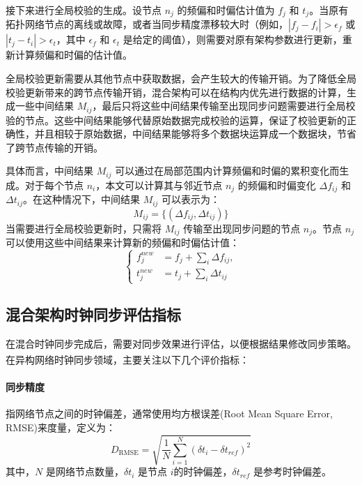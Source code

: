 \documentclass[UTF8,a4paper,12pt]{ctexart}
\numberwithin{equation}{section}
\begin{document}
接下来进行全局校验的生成。设节点 $n_j$ 的频偏和时偏估计值为 $f_j$ 和 $t_j$。当原有拓扑网络节点的离线或故障，或者当同步精度漂移较大时（例如，$|f_j - f_i| > \epsilon_f$ 或 $|t_j - t_i| > \epsilon_t$，其中 $\epsilon_f$ 和 $\epsilon_t$ 是给定的阈值），则需要对原有架构参数进行更新，重新计算频偏和时偏的估计值。

全局校验更新需要从其他节点中获取数据，会产生较大的传输开销。为了降低全局校验更新带来的跨节点传输开销，混合架构可以在结构内优先进行数据的计算，生成一些中间结果 $M_{ij}$，最后只将这些中间结果传输至出现同步问题需要进行全局校验的节点。这些中间结果能够代替原始数据完成校验的运算，保证了校验更新的正确性，并且相较于原始数据，中间结果能够将多个数据块运算成一个数据块，节省了跨节点传输的开销。

具体而言，中间结果 $M_{ij}$ 可以通过在局部范围内计算频偏和时偏的累积变化而生成。对于每个节点 $n_i$，本文可以计算其与邻近节点 $n_j$ 的频偏和时偏变化 $\Delta f_{ij}$ 和 $\Delta t_{ij}$。在这种情况下，中间结果 $M_{ij}$ 可以表示为：
\begin{equation}
	M_{ij} = \{(\Delta f_{ij}, \Delta t_{ij})\}
\end{equation}
当需要进行全局校验更新时，只需将 $M_{ij}$ 传输至出现同步问题的节点 $n_j$。节点 $n_j$ 可以使用这些中间结果来计算新的频偏和时偏估计值：
\begin{equation}
	\left\{
	\begin{aligned}
	f_j^{new} &= f_j + \sum_{i} \Delta f_{ij},\\
	t_j^{new} &= t_j + \sum_{i} \Delta t_{ij}
	\end{aligned}
	\right.
\end{equation}


\subsection{混合架构时钟同步评估指标}

在混合时钟同步完成后，需要对同步效果进行评估，以便根据结果修改同步策略。在异构网络时钟同步领域，主要关注以下几个评价指标\textsuperscript{\cite{chi2018ear}}：
	\paragraph{同步精度}指网络节点之间的时钟偏差，通常使用均方根误差(Root Mean Square Error, RMSE)来度量，定义为：
	\begin{equation}
		D_\text{RMSE} = \sqrt{\frac{1}{N} \sum_{i=1}^{N} (\delta t_{i} - \delta t_{ref})^2}
	\end{equation}
其中，$N$ 是网络节点数量，$\delta t_{i}$ 是节点 $i$的时钟偏差，$\delta t_{ref}$ 是参考时钟偏差。
\end{document}
